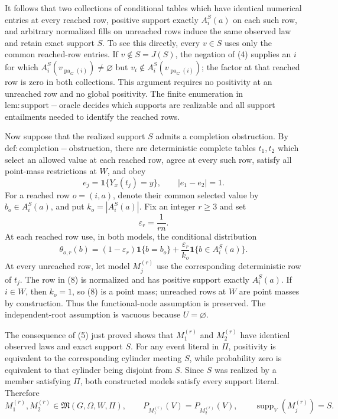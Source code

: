 It follows that two collections of conditional tables which have identical numerical entries at every reached row, positive support exactly \(A_i^S(a)\) on each such row, and arbitrary normalized fills on unreached rows induce the same observed law and retain exact support \(S\).  To see this directly, every \(v\in S\) uses only the common reached-row entries.  If \(v\notin S=J(S)\), the negation of (4) supplies an \(i\) for which \(A_i^S(v_{\operatorname{pa}_G(i)})\neq\varnothing\) but \(v_i\notin A_i^S(v_{\operatorname{pa}_G(i)})\); the factor at that reached row is zero in both collections.  This argument requires no positivity at an unreached row and no global positivity.  The finite enumeration in \(\mathrm{lem:support-oracle}\) decides which supports are realizable and all support entailments needed to identify the reached rows.

Now suppose that the realized support \(S\) admits a completion obstruction.  By \(\mathrm{def:completion-obstruction}\), there are deterministic complete tables \(t_1,t_2\) which select an allowed value at each reached row, agree at every such row, satisfy all point-mass restrictions at \(W\), and obey
\[
 e_j=\mathbf 1\{Y_x(t_j)=y\},\qquad |e_1-e_2|=1.
 \tag{6}
\]
For a reached row \(o=(i,a)\), denote their common selected value by \(b_o\in A_i^S(a)\), and put \(k_o=|A_i^S(a)|\).  Fix an integer \(r\geq3\) and set
\[
 \varepsilon_r=\frac{1}{rn}.
 \tag{7}
\]
At each reached row use, in both models, the conditional distribution
\[
 \theta_{o,r}(b)
 =(1-\varepsilon_r)\mathbf 1\{b=b_o\}
 +\frac{\varepsilon_r}{k_o}\mathbf 1\{b\in A_i^S(a)\}.
 \tag{8}
\]
At every unreached row, let model \(M_j^{(r)}\) use the corresponding deterministic row of \(t_j\).  The row in (8) is normalized and has positive support exactly \(A_i^S(a)\).  If \(i\in W\), then \(k_o=1\), so (8) is a point mass; unreached rows at \(W\) are point masses by construction.  Thus the functional-node assumption is preserved.  The independent-root assumption is vacuous because \(U=\varnothing\).

The consequence of (5) just proved shows that \(M_1^{(r)}\) and \(M_2^{(r)}\) have identical observed laws and exact support \(S\).  For any event literal in \(\Pi\), positivity is equivalent to the corresponding cylinder meeting \(S\), while probability zero is equivalent to that cylinder being disjoint from \(S\).  Since \(S\) was realized by a member satisfying \(\Pi\), both constructed models satisfy every support literal.  Therefore
\[
 M_1^{(r)},M_2^{(r)}\in\mathfrak M(G,\Omega,W,\Pi),\qquad
 P_{M_1^{(r)}}(V)=P_{M_2^{(r)}}(V),\qquad
 \operatorname{supp}_V(M_j^{(r)})=S.
 \tag{9}
\]

